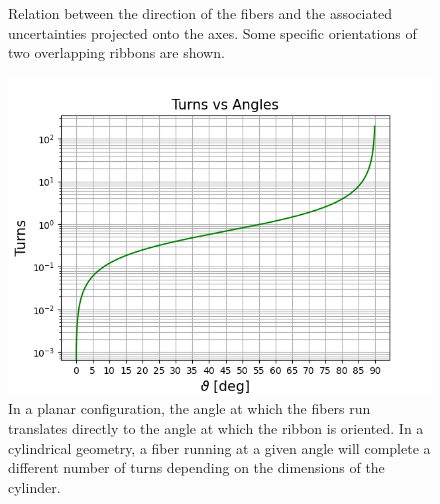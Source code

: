 \begin{refsection}
\begin{figure}
{            \label{fig:CyFi:examples:b}}
            \caption{Relation between the direction of the fibers and the associated uncertainties projected onto the axes. Some specific orientations of two overlapping ribbons are shown.}
        \end{figure}
        \begin{figure}
            \centering
            \includegraphics[width=\textwidth]{Figures/muEDM/CyFi/TurnsVsAngles.png}
            \caption{In a planar configuration, the angle at which the fibers run translates directly to the angle at which the ribbon is oriented. In a cylindrical geometry, a fiber running at a given angle will complete a different number of turns depending on the dimensions of the cylinder.}
            \label{fig:CyFi:TurnsVsAngles}
        \end{figure}
        \begin{figure}[ht]   
            \centering

\end{figure}
\end{refsection}
